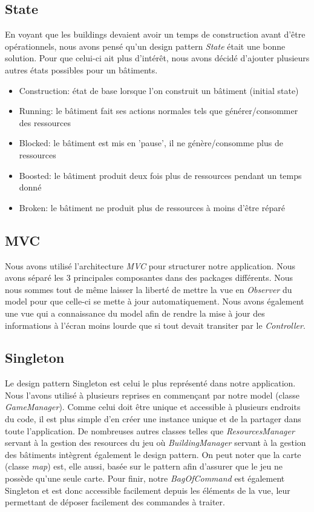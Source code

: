 \documentclass{article}
\begin{document}
\subsection{State}
En voyant que les buildings devaient avoir un temps de construction avant d'être opérationnels, nous avons pensé qu'un design pattern
\textit{State} était une bonne solution. Pour que celui-ci ait plus d'intérêt, nous avons décidé d'ajouter plusieurs autres états possibles
pour un bâtiments.
\begin{itemize}
    \item Construction: état de base lorsque l'on construit un bâtiment (initial state)
    \item Running: le bâtiment fait ses actions normales tels que générer/consommer des ressources
    \item Blocked: le bâtiment est mis en 'pause', il ne génère/consomme plus de ressources
    \item Boosted: le bâtiment produit deux fois plus de ressources pendant un temps donné
    \item Broken: le bâtiment ne produit plus de ressources à moins d'être réparé
\end{itemize}

\subsection{MVC}
Nous avons utilisé l'architecture \textit{MVC} pour structurer notre application. Nous avons séparé les 3 principales composantes
dans des packages différents. Nous nous sommes tout de même laisser la liberté de mettre la vue en \textit{Observer} du model pour
que celle-ci se mette à jour automatiquement. Nous avons également une vue qui a connaissance du model afin de rendre la mise à
jour des informations à l'écran moins lourde que si tout devait transiter par le \textit{Controller}.

\subsection{Singleton}
Le design pattern Singleton est celui le plus représenté dans notre application. Nous l'avons utilisé à plusieurs reprises en commençant par
notre model (classe \textit{GameManager}). Comme celui doit être unique et accessible à plusieurs endroits du code, il est plus simple d'en créer 
une instance unique et de la partager dans toute l'application. De nombreuses autres classes telles que \textit{ResourcesManager} servant à la gestion
des resources du jeu où \textit{BuildingManager} servant à la gestion des bâtiments intègrent également le design pattern. On peut noter que la carte 
(classe \textit{map}) est, elle aussi, basée sur le pattern afin d'assurer que le jeu ne possède qu'une seule carte. Pour finir, notre \textit{BagOfCommand}
est également Singleton et est donc accessible facilement depuis les éléments de la vue, leur permettant de déposer facilement des commandes à traiter.
\end{document}
